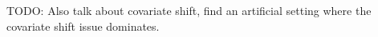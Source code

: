 \documentclass[11pt,letterpaper]{article}
\newcommand{\regex}{\textsc{Regex}\xspace}
\begin{document}
TODO: Also talk about covariate shift, find an artificial
setting where the covariate shift issue dominates.

%
%
%
\end{document}
